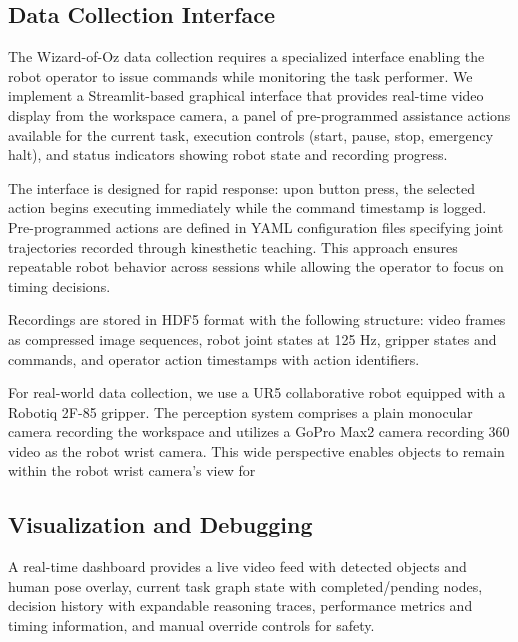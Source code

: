 \documentclass[sensors,article,submit,pdftex,moreauthors]{Definitions/mdpi}
\begin{document}
\subsection{Data Collection Interface}

The Wizard-of-Oz data collection requires a specialized interface enabling the robot operator to issue commands while monitoring the task performer. We implement a Streamlit-based graphical interface that provides real-time video display from the workspace camera, a panel of pre-programmed assistance actions available for the current task, execution controls (start, pause, stop, emergency halt), and status indicators showing robot state and recording progress.

The interface is designed for rapid response: upon button press, the selected action begins executing immediately while the command timestamp is logged. Pre-programmed actions are defined in YAML configuration files specifying joint trajectories recorded through kinesthetic teaching. This approach ensures repeatable robot behavior across sessions while allowing the operator to focus on timing decisions.

Recordings are stored in HDF5 format with the following structure: video frames as compressed image sequences, robot joint states at 125 Hz, gripper states and commands, and operator action timestamps with action identifiers.

For real-world data collection, we use a UR5 collaborative robot equipped with a Robotiq 2F-85 gripper. The perception system comprises a plain monocular camera recording the workspace and utilizes a GoPro Max2 camera recording 360 video as the robot wrist camera. This wide perspective enables objects to remain within the robot wrist camera's view for

\subsection{Visualization and Debugging}

A real-time dashboard provides a live video feed with detected objects and human pose overlay, current task graph state with completed/pending nodes, decision history with expandable reasoning traces, performance metrics and timing information, and manual override controls for safety.

\end{document}

